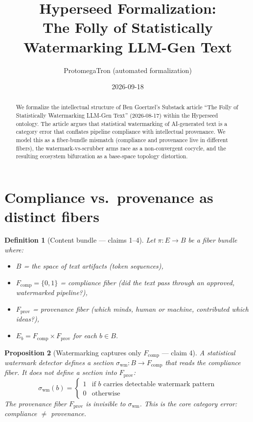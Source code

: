 \documentclass[11pt,a4paper]{article}
\title{Hyperseed Formalization:\\
  The Folly of Statistically Watermarking LLM-Gen Text}
\author{ProtomegaTron (automated formalization)}
\date{2026-09-18}
\newtheorem{definition}{Definition}[section]
\newtheorem{proposition}[definition]{Proposition}
\begin{document}
\maketitle

\begin{abstract}
We formalize the intellectual structure of Ben Goertzel's Substack article
``The Folly of Statistically Watermarking LLM-Gen Text''
(2026-08-17) within the Hyperseed ontology. The article argues that
statistical watermarking of AI-generated text is a category error that
conflates pipeline compliance with intellectual provenance. We model
this as a fiber-bundle mismatch (compliance and provenance live in
different fibers), the watermark-vs-scrubber arms race as a
non-convergent cocycle, and the resulting ecosystem bifurcation as a
base-space topology distortion.
\end{abstract}

\tableofcontents

\section{Compliance vs.\ provenance as distinct fibers}
\label{sec:fibers}

\begin{definition}[Content bundle --- claims 1--4]
\label{def:content-bundle}
Let $\pi : E \to B$ be a fiber bundle where:
\begin{itemize}
\item $B$ = the space of text artifacts (token sequences),
\item $F_{\text{comp}} = \{0, 1\}$ = compliance fiber (did the text pass
  through an approved, watermarked pipeline?),
\item $F_{\text{prov}}$ = provenance fiber (which minds, human or machine,
  contributed which ideas?),
\item $E_b = F_{\text{comp}} \times F_{\text{prov}}$ for each $b \in B$.
\end{itemize}
\end{definition}

\begin{proposition}[Watermarking captures only $F_{\text{comp}}$ --- claim 4]
\label{prop:compliance-only}
A statistical watermark detector defines a section
$\sigma_{\text{wm}} : B \to F_{\text{comp}}$ that reads the compliance
fiber. It does \emph{not} define a section into $F_{\text{prov}}$:
\[
  \sigma_{\text{wm}}(b) = \begin{cases}
    1 & \text{if } b \text{ carries detectable watermark pattern} \\
    0 & \text{otherwise}
  \end{cases}
\]
The provenance fiber $F_{\text{prov}}$ is invisible to $\sigma_{\text{wm}}$.
This is the core category error: compliance $\neq$ provenance.
\end{proposition}
\end{document}
